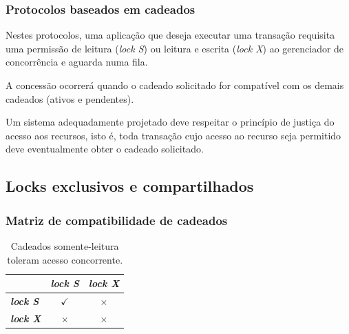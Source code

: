 \documentclass{beamer}
\begin{document}

\begin{frame} %
    \frametitle{Protocolos baseados em cadeados}

    Nestes protocolos, uma aplicação que deseja executar uma transação requisita uma permissão de leitura (\emph{lock S}) ou leitura e escrita (\emph{lock X}) ao gerenciador de concorrência e aguarda numa fila.

    \medskip
        
    A concessão ocorrerá quando o cadeado solicitado for compatível com os demais cadeados (ativos e pendentes).

    \medskip

    Um sistema adequadamente projetado deve respeitar o princípio de justiça do acesso aos recursos, isto é, toda transação cujo acesso ao recurso seja permitido deve eventualmente obter o cadeado solicitado. 
\end{frame}


\subsection{Locks exclusivos e compartilhados}

\begin{frame} %
    \frametitle{Matriz de compatibilidade de cadeados}
    
    \begin{table}
    \begin{tabular}{l c c}
        \toprule

        \textbf{} & \textbf{\emph{lock S}} & \textbf{\emph{lock X}}\\

        \midrule

        \textbf{\emph{lock S}} & $\checkmark$ & $\times$ \\
        \textbf{\emph{lock X}} & $\times$ & $\times$ \\

        \bottomrule
    \end{tabular}
    \caption{Cadeados somente-leitura toleram acesso concorrente.}
    \end{table}
\end{frame}

\end{document}
